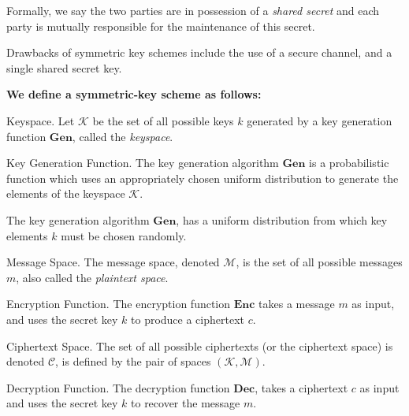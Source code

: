 Formally, we say the two parties are in possession of a \emph{shared secret} and each party is mutually responsible for the maintenance of this secret.

Drawbacks of symmetric key schemes include the use of a secure channel, and a single shared secret key. 


\large \textbf{We define a symmetric-key scheme as follows:}
\medskip

\begin{defn}{Keyspace. } 
	Let $\mathbf{\mathcal{K}}$ be the set of all possible keys $k$  generated by a key generation function $\mathbf{Gen}$, called the \emph{keyspace}.
\end{defn}

\medskip

\begin{defn}{Key Generation Function. }
	The key generation algorithm $\mathbf{Gen}$ is a probabilistic function which uses an appropriately chosen uniform distribution to generate the elements of the keyspace $\mathcal{K}$.
\end{defn}

\medskip
The key generation algorithm $\mathbf{Gen}$, has a uniform distribution from which key elements $k$ must be chosen randomly.
\medskip

\begin{defn}{Message Space. }
	The \gls{message space}, denoted $\mathbf{\mathcal{M}}$, is the set of all possible messages $m$, also called the \emph{plaintext space}.
\end{defn}
\medskip


\begin{defn}{Encryption Function. }
	The encryption function $\mathbf{Enc}$ takes a message $m$ as input, and uses the secret key $k$ to produce a ciphertext $c$.
\end{defn}

\medskip

\begin{defn}{Ciphertext Space. }
	The set of all possible ciphertexts (or the ciphertext space) is denoted $\mathbf{\mathcal{C}}$, is defined by the pair of spaces $\mathbf{(\mathcal{K}, \mathcal{M})}$. 
\end{defn}

\medskip

\begin{defn}{Decryption Function. }
	The decryption function $\mathbf{Dec}$, takes a ciphertext $c$ as input and uses the secret key $k$ to recover the message $m$. 
\end{defn}

